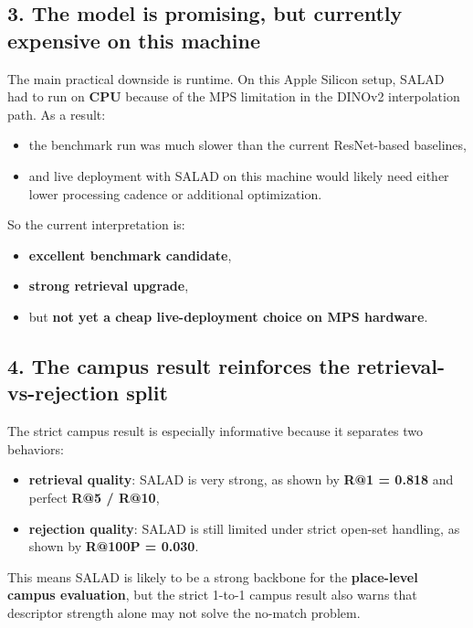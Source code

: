 \documentclass[11pt]{article}
\begin{document}
\subsection*{3. The model is promising, but currently expensive on this machine}
The main practical downside is runtime. On this Apple Silicon setup, SALAD had to run on \textbf{CPU} because of the MPS limitation in the DINOv2 interpolation path. As a result:
\begin{itemize}[leftmargin=*]
  \item the benchmark run was much slower than the current ResNet-based baselines,
  \item and live deployment with SALAD on this machine would likely need either lower processing cadence or additional optimization.
\end{itemize}

So the current interpretation is:
\begin{itemize}[leftmargin=*]
  \item \textbf{excellent benchmark candidate},
  \item \textbf{strong retrieval upgrade},
  \item but \textbf{not yet a cheap live-deployment choice on MPS hardware}.
\end{itemize}

\subsection*{4. The campus result reinforces the retrieval-vs-rejection split}
The strict campus result is especially informative because it separates two behaviors:
\begin{itemize}[leftmargin=*]
  \item \textbf{retrieval quality}: SALAD is very strong, as shown by \textbf{R@1 = 0.818} and perfect \textbf{R@5 / R@10},
  \item \textbf{rejection quality}: SALAD is still limited under strict open-set handling, as shown by \textbf{R@100P = 0.030}.
\end{itemize}

This means SALAD is likely to be a strong backbone for the \textbf{place-level campus evaluation}, but the strict 1-to-1 campus result also warns that descriptor strength alone may not solve the no-match problem.
\end{document}
